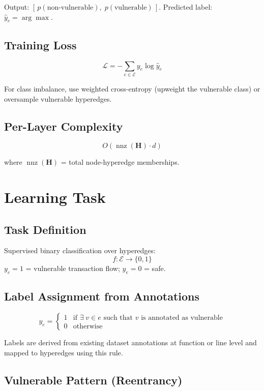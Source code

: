 \documentclass[11pt]{article}
\begin{document}
Output: $[\,p(\text{non-vulnerable}),\; p(\text{vulnerable})\,]$. Predicted label: $\hat{y}_e = \arg\max$.

\subsection{Training Loss}

\[
\mathcal{L} = -\sum_{e \in \mathcal{E}} y_e \log \hat{y}_e
\]

For class imbalance, use weighted cross-entropy (upweight the vulnerable class) or oversample vulnerable hyperedges.

\subsection{Per-Layer Complexity}

\[
O\!\left(\operatorname{nnz}(\mathbf{H}) \cdot d\right)
\]

where $\operatorname{nnz}(\mathbf{H})$ = total node-hyperedge memberships.

\section{Learning Task}

\subsection{Task Definition}

Supervised binary classification over hyperedges:
\[
f: \mathcal{E} \rightarrow \{0, 1\}
\]
$y_e = 1$ = vulnerable transaction flow; $y_e = 0$ = safe.

\subsection{Label Assignment from Annotations}

\[
y_e =
\begin{cases}
1 & \text{if } \exists\; v \in e \text{ such that } v \text{ is annotated as vulnerable} \\
0 & \text{otherwise}
\end{cases}
\]

Labels are derived from existing dataset annotations at function or line level and mapped to hyperedges using this rule.

\subsection{Vulnerable Pattern (Reentrancy)}
\end{document}
